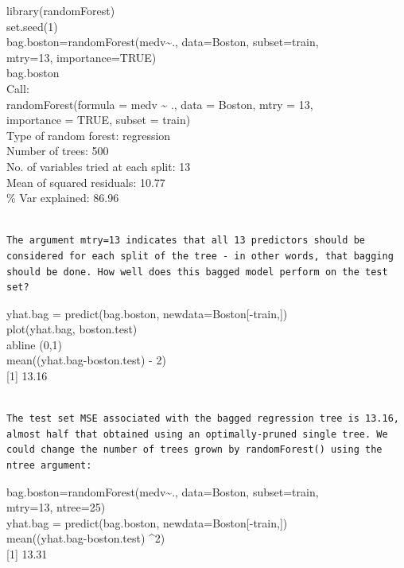 \documentclass[10pt]{article}
\begin{document}
\begin{displayquote}
library(randomForest)\\
set.seed(1)\\
bag.boston=randomForest(medv\~{}., data=Boston, subset=train,\\
mtry=13, importance=TRUE)\\
bag.boston\\
Call:\\
randomForest(formula = medv \~{} ., data = Boston, mtry = 13,\\
importance = TRUE, subset = train)\\
Type of random forest: regression\\
Number of trees: 500\\
No. of variables tried at each split: 13\\
Mean of squared residuals: 10.77\\
\% Var explained: 86.96
\end{displayquote}

\begin{verbatim}

The argument mtry=13 indicates that all 13 predictors should be considered for each split of the tree - in other words, that bagging should be done. How well does this bagged model perform on the test set?
\end{verbatim}

\begin{displayquote}
yhat.bag = predict(bag.boston, newdata=Boston[-train,])\\
plot(yhat.bag, boston.test)\\
abline (0,1)\\
mean((yhat.bag-boston.test) - 2)\\[0pt]
[1] 13.16
\end{displayquote}

\begin{verbatim}

The test set MSE associated with the bagged regression tree is 13.16, almost half that obtained using an optimally-pruned single tree. We could change the number of trees grown by randomForest() using the ntree argument:
\end{verbatim}

\begin{displayquote}
bag.boston=randomForest(medv\~{}., data=Boston, subset=train,\\
mtry=13, ntree=25)\\[0pt]
yhat.bag = predict(bag.boston, newdata=Boston[-train,])\\
mean((yhat.bag-boston.test) \^{}2)\\[0pt]
[1] 13.31
\end{displayquote}
\end{document}
